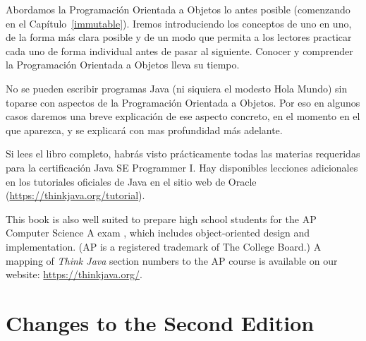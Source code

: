 Abordamos la Programación Orientada a Objetos lo antes posible (comenzando en el Capítulo~\ref{immutable}).
Iremos introduciendo los conceptos de uno en uno, de la forma más clara posible y de un modo que permita a los lectores practicar cada uno de forma individual antes de pasar al siguiente.
Conocer y comprender la Programación Orientada a Objetos lleva su tiempo.

No se pueden escribir programas Java (ni siquiera el modesto Hola Mundo) sin toparse con aspectos de la Programación Orientada a Objetos.
Por eso en algunos casos daremos una breve explicación de ese aspecto concreto, en el momento en el que aparezca, y se explicará con mas profundidad más adelante.

Si lees el libro completo, habrás visto prácticamente todas las materias requeridas para la certificación Java SE Programmer I.
Hay disponibles lecciones adicionales en los tutoriales oficiales de Java en el sitio web de Oracle (\url{https://thinkjava.org/tutorial}).

This book is also well suited to prepare high school students for the AP Computer Science A exam \footnotemark, which includes object-oriented design and implementation.
(AP is a registered trademark of The College Board.)
A mapping of {\it Think Java} section numbers to the AP course is available on our website: \url{https://thinkjava.org/}.


\section*{Changes to the Second Edition}

